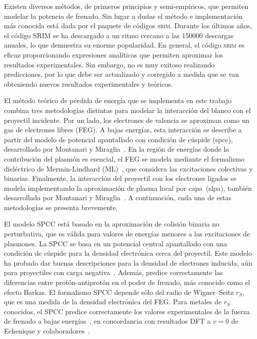 Existen diversos métodos, de primeros principios y semi-empíricos, que 
permiten modelar la potencia de frenado. Sin lugar a dudas el método e
implementación más conocida está dada por el paquete de códigos 
\textsc{srim}.
Durante los últimos años, el código SRIM se ha descargado a un ritmo 
cercano a las 150000 descargas anuales, lo que demuestra su enorme 
popularidad. En general, el código \textsc{srim} es eficaz 
proporcionando expresiones analíticas que permiten aproximar los 
resultados experimentales. Sin embargo, no es muy exitoso realizando 
predicciones, por lo que debe ser actualizado y corregido a medida que 
se van obteniendo nuevos resultados experimentales y teóricos. 

El método teórico de pérdida de energía que se implementa en este 
trabajo combina tres metodologías distintas para modelar la interacción 
del blanco con el proyectil incidente. Por un lado, los electrones de 
valencia se aproximan como un gas de electrones libres (FEG). A bajas 
energías, esta interacción se describe a partir del modelo de potencial 
apantallado con condición de cúspide (\acs{spcc}), desarrollado por 
Montanari y Miraglia~\cite{Montanari:17}. En la región de energías donde 
la contribución del plasmón es esencial, el FEG se modela mediante el 
formalismo dieléctrico de Mermin-Lindhard (ML)~\cite{Mermin:70}, que 
considera las excitaciones colectivas y binarias. Finalmente, la 
interacción del proyectil con los electrones ligados se modela 
implementando la aproximación de plasma local por capa~(\acs{slpa}), 
también desarrollada por Montanari y 
Miraglia~\cite{Montanari:17,Montanari:13}. A continuación, cada una de 
estas metodologías se presenta brevemente.

El modelo SPCC está basado en la aproximación de colisión binaria no 
perturbativa, que es válida para valores de energías menores a las 
excitaciones de plasmones. La SPCC se basa en un potencial central 
apantallado con una condición de cúspide para la densidad electrónica 
cerca del proyectil. Este modelo ha probado dar buenas descripciones 
para la densidad de electrones inducida, aún para proyectiles con carga 
negativa~\cite{Montanari:17}. Además, predice correctamente las 
diferencias entre protón-antiprotón en el poder de frenado, más 
conocido como el efecto Barkas. El formalismo SPCC depende sólo del 
radio de Wigner--Seitz $r_S$, que es una medida de la densidad 
electrónica del FEG. Para metales de $r_S$ conocidos, el SPCC predice 
correctamente los valores experimentales de la fuerza de frenado a 
bajas energías~\cite{Montanari:17}, en concordancia con resultados DFT 
a $v=0$ de Echenique y colaboradores~\cite{Echenique:81,Nagy:89}.

